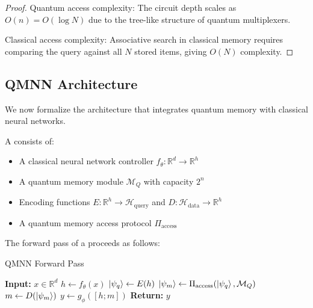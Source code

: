 \begin{proof}
Quantum access complexity: The \qram circuit depth scales as $O(n) = O(\log N)$ due to the tree-like structure of quantum multiplexers.

Classical access complexity: Associative search in classical memory requires comparing the query against all $N$ stored items, giving $O(N)$ complexity.
\end{proof}

\subsection{QMNN Architecture}

We now formalize the \qmnn architecture that integrates quantum memory with classical neural networks.

\begin{definition}
\label{def:qmnn}
A \qmnn consists of:
\begin{itemize}
    \item A classical neural network controller $f_{\theta}: \mathbb{R}^d \rightarrow \mathbb{R}^h$
    \item A quantum memory module $\mathcal{M}_Q$ with capacity $2^n$
    \item Encoding functions $E: \mathbb{R}^h \rightarrow \mathcal{H}_{\text{query}}$ and $D: \mathcal{H}_{\text{data}} \rightarrow \mathbb{R}^h$
    \item A quantum memory access protocol $\Pi_{\text{access}}$
\end{itemize}
\end{definition}

The forward pass of a \qmnn proceeds as follows:

\begin{algorithm}
\caption{QMNN Forward Pass}
\label{alg:qmnn_forward}
\begin{algorithmic}
\STATE \textbf{Input:} $x \in \mathbb{R}^d$
\STATE $h \leftarrow f_{\theta}(x)$ 
\STATE $\left|\psi_q\right\rangle \leftarrow E(h)$ 
\STATE $\left|\psi_m\right\rangle \leftarrow \Pi_{\text{access}}(\left|\psi_q\right\rangle, \mathcal{M}_Q)$ 
\STATE $m \leftarrow D(\left|\psi_m\right\rangle)$ 
\STATE $y \leftarrow g_{\phi}([h; m])$ 
\STATE \textbf{Return:} $y$
\end{algorithmic}
\end{algorithm}

